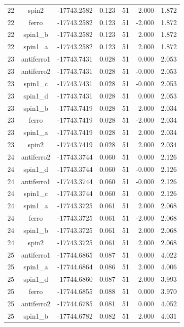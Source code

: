 \begin{longtable}{@{}ccrrrrr@{}}
22 & spin2 & -17743.2582 & 0.123 & 51 & 2.000 & 1.872 \\
22 & ferro & -17743.2582 & 0.123 & 51 & -2.000 & 1.872 \\
22 & spin1\_b & -17743.2582 & 0.123 & 51 & 2.000 & 1.872 \\
22 & spin1\_a & -17743.2582 & 0.123 & 51 & 2.000 & 1.872 \\
\rowcolor{gray!20} 23 & antiferro1 & -17743.7431 & 0.028 & 51 & 0.000 & 2.053 \\
23 & antiferro2 & -17743.7431 & 0.028 & 51 & -0.000 & 2.053 \\
23 & spin1\_c & -17743.7431 & 0.028 & 51 & -0.000 & 2.053 \\
23 & spin1\_d & -17743.7431 & 0.028 & 51 & 0.000 & 2.053 \\
23 & spin1\_b & -17743.7419 & 0.028 & 51 & 2.000 & 2.034 \\
23 & ferro & -17743.7419 & 0.028 & 51 & -2.000 & 2.034 \\
23 & spin1\_a & -17743.7419 & 0.028 & 51 & 2.000 & 2.034 \\
23 & spin2 & -17743.7419 & 0.028 & 51 & 2.000 & 2.034 \\
\rowcolor{gray!20} 24 & antiferro2 & -17743.3744 & 0.060 & 51 & 0.000 & 2.126 \\
24 & spin1\_d & -17743.3744 & 0.060 & 51 & -0.000 & 2.126 \\
24 & antiferro1 & -17743.3744 & 0.060 & 51 & -0.000 & 2.126 \\
24 & spin1\_c & -17743.3744 & 0.060 & 51 & 0.000 & 2.126 \\
24 & spin1\_a & -17743.3725 & 0.061 & 51 & 2.000 & 2.068 \\
24 & ferro & -17743.3725 & 0.061 & 51 & -2.000 & 2.068 \\
24 & spin1\_b & -17743.3725 & 0.061 & 51 & 2.000 & 2.068 \\
24 & spin2 & -17743.3725 & 0.061 & 51 & 2.000 & 2.068 \\
\rowcolor{gray!20} 25 & antiferro1 & -17744.6865 & 0.087 & 51 & 0.000 & 4.022 \\
25 & spin1\_a & -17744.6864 & 0.086 & 51 & 2.000 & 4.006 \\
25 & spin1\_d & -17744.6860 & 0.087 & 51 & 2.000 & 3.993 \\
25 & ferro & -17744.6855 & 0.088 & 51 & 0.000 & 3.970 \\
25 & antiferro2 & -17744.6785 & 0.081 & 51 & 0.000 & 4.052 \\
25 & spin1\_b & -17744.6782 & 0.082 & 51 & 2.000 & 4.031 \\

\end{longtable}
